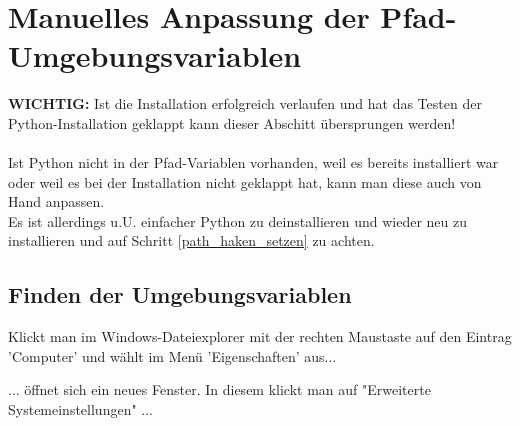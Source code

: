\documentclass[ngerman,oneside, a4letter]{article}
\begin{document}
\clearpage
\section{Manuelles Anpassung der Pfad-Umgebungsvariablen}
\textbf{WICHTIG: } Ist die Installation erfolgreich verlaufen und hat das Testen der Python-Installation geklappt kann dieser Abschitt übersprungen werden!
\\
\\
Ist Python nicht in der Pfad-Variablen vorhanden, weil es bereits installiert war oder weil es bei der Installation nicht geklappt hat, kann man diese auch von Hand anpassen.
\\Es ist allerdings u.U. einfacher Python zu deinstallieren und wieder neu zu installieren und auf Schritt \ref{path_haken_setzen} zu achten.

\subsection{Finden der Umgebungsvariablen}
Klickt man im Windows-Dateiexplorer mit der rechten Maustaste auf den Eintrag 'Computer' und wählt im Menü 'Eigenschaften' aus...
\begin{center}
\end{center}

\clearpage
\noindent... öffnet sich ein neues Fenster. In diesem klickt man auf "Erweiterte Systemeinstellungen" ...
\end{document}
